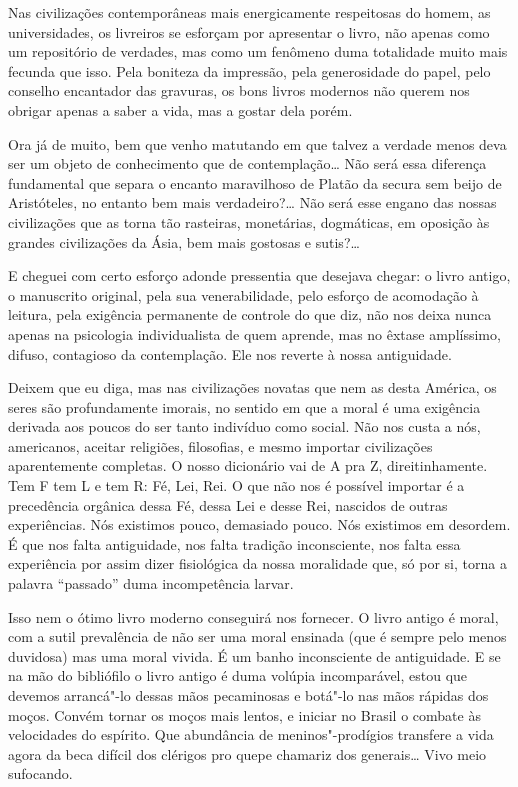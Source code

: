 Nas civilizações contemporâneas mais energicamente respeitosas do homem,
as universidades, os livreiros se esforçam por apresentar o livro, não
apenas como um repositório de verdades, mas como um fenômeno duma
totalidade muito mais fecunda que isso. Pela boniteza da impressão, pela
generosidade do papel, pelo conselho encantador das gravuras, os bons
livros modernos não querem nos obrigar apenas a saber a vida, mas a
gostar dela porém.

Ora já de muito, bem que venho matutando em que talvez a verdade menos
deva ser um objeto de conhecimento que de contemplação\ldots{} Não será essa
diferença fundamental que separa o encanto maravilhoso de Platão da
secura sem beijo de Aristóteles, no entanto bem mais verdadeiro?\ldots{} Não
será esse engano das nossas civilizações que as torna tão rasteiras,
monetárias, dogmáticas, em oposição às grandes civilizações da Ásia, bem
mais gostosas e sutis?\ldots{}

E cheguei com certo esforço adonde pressentia que desejava chegar: o
livro antigo, o manuscrito original, pela sua venerabilidade, pelo
esforço de acomodação à leitura, pela exigência permanente de controle
do que diz, não nos deixa nunca apenas na psicologia individualista de
quem aprende, mas no êxtase amplíssimo, difuso, contagioso da
contemplação. Ele nos reverte à nossa antiguidade.

Deixem que eu diga, mas nas civilizações novatas que nem as desta
América, os seres são profundamente imorais, no sentido em que a moral é
uma exigência derivada aos poucos do ser tanto indivíduo como social.
Não nos custa a nós, americanos, aceitar religiões, filosofias, e mesmo
importar civilizações aparentemente completas. O nosso dicionário vai de
A pra Z, direitinhamente. Tem F tem L e tem R: Fé, Lei, Rei. O que não
nos é possível importar é a precedência orgânica dessa Fé, dessa Lei e
desse Rei, nascidos de outras experiências. Nós existimos pouco,
demasiado pouco. Nós existimos em desordem. É que nos falta antiguidade,
nos falta tradição inconsciente, nos falta essa experiência por assim
dizer fisiológica da nossa moralidade que, só por si, torna a palavra
``passado'' duma incompetência larvar.

Isso nem o ótimo livro moderno conseguirá nos fornecer. O livro antigo é
moral, com a sutil prevalência de não ser uma moral ensinada (que é
sempre pelo menos duvidosa) mas uma moral vivida. É um banho
inconsciente de antiguidade. E se na mão do bibliófilo o livro antigo é
duma volúpia incomparável, estou que devemos arrancá"-lo dessas mãos
pecaminosas e botá"-lo nas mãos rápidas dos moços. Convém tornar os moços
mais lentos, e iniciar no Brasil o combate às velocidades do espírito.
Que abundância de meninos"-prodígios transfere a vida agora da beca
difícil dos clérigos pro quepe chamariz dos generais\ldots{} Vivo meio
sufocando.

